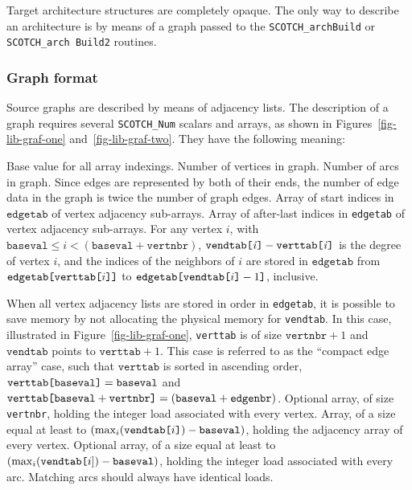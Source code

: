 Target architecture structures are completely opaque. The only way
to describe an architecture is by means of a graph passed to the
{\tt SCOTCH\_\lbt arch\lbt Build} or {\tt SCOTCH\_\lbt arch\lbt
Build2} routines.

\subsubsection{Graph format}
\label{sec-lib-format-graph}

Source graphs are described by means of adjacency lists. The
description of a graph requires several {\tt SCOTCH\_Num} scalars and
arrays, as shown in Figures~\ref{fig-lib-graf-one}
and~\ref{fig-lib-graf-two}. They have the following meaning:
\begin{itemize}
\iteme[{\tt baseval}]
Base value for all array indexings.
\iteme[{\tt vertnbr}]
Number of vertices in graph.
\iteme[{\tt edgenbr}]
Number of arcs in graph. Since edges are represented by both of their
ends, the number of edge data in the graph is twice the number of
graph edges.
\iteme[{\tt verttab}]
Array of start indices in $\mathtt{edgetab}$ of vertex adjacency
sub-arrays.
\iteme[{\tt vendtab}]
Array of after-last indices in {\tt edgetab} of vertex adjacency
sub-arrays.
For any vertex $i$, with $\mathtt{baseval} \leq i < (\mathtt{baseval}
+ \mathtt{vertnbr})$, $\mathtt{vendtab}\mbox{\tt [}\mathit{i}\mbox{\tt
]} - \mathtt{verttab}\mbox{\tt [}\mathit{i}\mbox{\tt ]}$ is the degree
of vertex $i$, and the indices of the neighbors of $i$ are stored in
$\mathtt{edgetab}$ from $\mathtt{edgetab}\lbt \mbox{\tt
[}\mathtt{verttab}\mbox{\tt [}i\mbox{\tt ]]}$ to
$\mathtt{edgetab}\lbt \mbox{\tt [}\mathtt{vendtab}\mbox{\tt
[}i\mbox{\tt ]} - 1\mbox{\tt ]}$, inclusive.

When all vertex adjacency lists are stored in order in {\tt edgetab},
it is possible to save memory by not allocating the physical memory
for {\tt vendtab}. In this case, illustrated in
Figure~\ref{fig-lib-graf-one}, {\tt verttab} is of size
$\mathtt{vertnbr} + 1$ and $\mathtt{vendtab}$ points to
$\mathtt{verttab} + 1$. This case is referred to as the ``compact edge
array'' case, such that $\mathtt{verttab}$ is sorted in ascending
order, $\mathtt{verttab}\mbox{\tt [}\lbt\mathtt{baseval}\mbox{\tt ]} =
\mathtt{baseval}$ and $\mathtt{verttab}\lbt\mbox{\tt
[}\mathtt{baseval} + \mathtt{vertnbr}\mbox{\tt ]} =
(\mathtt{baseval} + \mathtt{edgenbr})$. 
\iteme[{\tt velotab}]
Optional array, of size {\tt vertnbr}, holding the integer load
associated with every vertex.
\iteme[{\tt edgetab}]
Array, of a size equal at least to
$\left(\max_{i}(\mathtt{vendtab}\mbox{\tt [}i\mbox{\tt ]}) -
\mathtt{baseval}\right)$, holding the adjacency array of every
vertex.
\iteme[{\tt edlotab}]
Optional array, of a size equal at least to $\left(\max_{i}(\mbox{\tt
vendtab[} i \mathtt{]}) - \mathtt{baseval}\right)$, holding the
integer load associated with every arc. Matching arcs should always
have identical loads.
\end{itemize}

